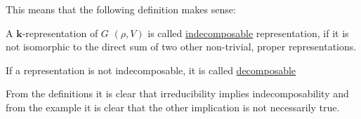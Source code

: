 This means that the following definition makes sense:

\begin{definition} A $\mathbf{k}$-representation of $G$ $(\rho,V)$ is called \ul{indecomposable} representation, if it is not isomorphic to the direct sum of two other non-trivial, proper representations.

If a representation is not indecomposable, it is called \ul{decomposable}
\end{definition}

From the definitions it is clear that irreducibility implies indecomposability and from the example it is clear that the other implication is not necessarily true. 

%
%
%
%
%

